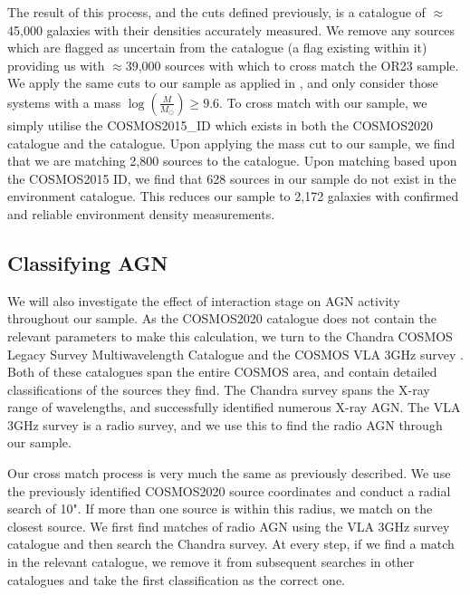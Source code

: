 \documentclass[fleqn,usenatbib]{mnras}
\begin{document}
The result of this process, and the cuts defined previously, is a catalogue of $\approx$45,000 galaxies with their densities accurately measured. We remove any sources which are flagged as uncertain from the catalogue (a flag existing within it) providing us with $\approx$39,000 sources with which to cross match the OR23 sample. We apply the same cuts to our sample as applied in \citet{2017ApJ...837...16D}, and only consider those systems with a mass $\log(\frac{M}{M_\odot}) \geq 9.6$. To cross match with our sample, we simply utilise the COSMOS2015\_ID which exists in both the COSMOS2020 catalogue and the \citet{2017ApJ...837...16D} catalogue. Upon applying the mass cut to our sample, we find that we are matching 2,800 sources to the \citet{2017ApJ...837...16D} catalogue. Upon matching based upon the COSMOS2015 ID, we find that 628 sources in our sample do not exist in the environment catalogue. This reduces our sample to 2,172 galaxies with confirmed and reliable environment density measurements.

\subsection{Classifying AGN}\label{sec:agn-clsf}
\noindent We will also investigate the effect of interaction stage on AGN activity throughout our sample. As the COSMOS2020 catalogue does not contain the relevant parameters to make this calculation, we turn to the Chandra COSMOS Legacy Survey Multiwavelength Catalogue \citep{2016ApJ...817...34M} and the COSMOS VLA 3GHz survey \citep{2017A&A...602A...6S, 2017A&A...602A...3D}. Both of these catalogues span the entire COSMOS area, and contain detailed classifications of the sources they find. The Chandra survey spans the X-ray range of wavelengths, and successfully identified numerous X-ray AGN. The VLA 3GHz survey is a radio survey, and we use this to find the radio AGN through our sample. 

Our cross match process is very much the same as previously described. We use the previously identified COSMOS2020 source coordinates and conduct a radial search of 10". If more than one source is within this radius, we match on the closest source. We first find matches of radio AGN using the VLA 3GHz survey catalogue and then search the Chandra survey. At every step, if we find a match in the relevant catalogue, we remove it from subsequent searches in other catalogues and take the first classification as the correct one.
\end{document}
